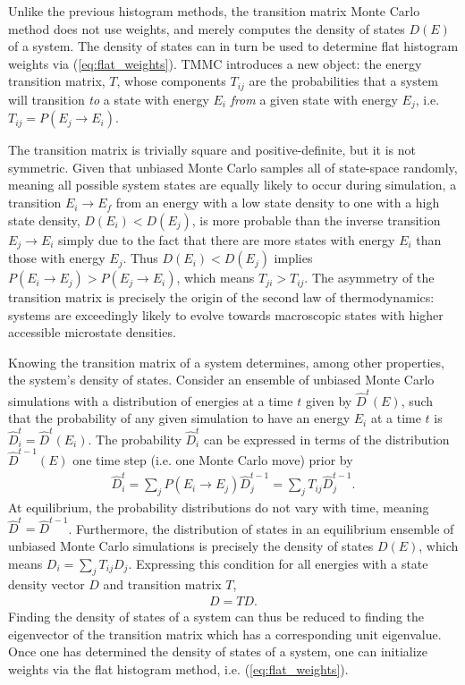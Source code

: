 \documentclass[11pt]{article}
\newcommand{\p}[1]{\left(#1\right)} %
\begin{document}
Unlike the previous histogram methods, the transition matrix Monte
Carlo method does not use weights, and merely computes the density of
states $D\p{E}$ of a system\cite{wang2002transition}. The density of
states can in turn be used to determine flat histogram weights via
(\ref{eq:flat_weights}). TMMC introduces a new object: the energy
transition matrix, $T$, whose components $T_{ij}$ are the
probabilities that a system will transition {\it to} a state with
energy $E_i$ {\it from} a given state with energy $E_j$,
i.e. $T_{ij}=P\p{E_j\to E_i}$.

The transition matrix is trivially square and positive-definite, but
it is not symmetric. Given that unbiased Monte Carlo samples all of
state-space randomly, meaning all possible system states are equally
likely to occur during simulation, a transition $E_i\to E_f$ from an
energy with a low state density to one with a high state density,
$D\p{E_i}<D\p{E_j}$, is more probable than the inverse transition
$E_j\to E_i$ simply due to the fact that there are more states with
energy $E_i$ than those with energy $E_j$. Thus $D\p{E_i}<D\p{E_j}$
implies $P\p{E_i\to E_j}>P\p{E_j\to E_i}$, which means
$T_{ji}>T_{ij}$. The asymmetry of the transition matrix is precisely
the origin of the second law of thermodynamics: systems are
exceedingly likely to evolve towards macroscopic states with higher
accessible microstate densities.

Knowing the transition matrix of a system determines, among other
properties, the system's density of states. Consider an ensemble of
unbiased Monte Carlo simulations with a distribution of energies at a
time $t$ given by $\hat D^{t}\p{E}$, such that the probability of any
given simulation to have an energy $E_i$ at a time $t$ is $\hat
D_i^{t}=\hat D^{t}\p{E_i}$. The probability $\hat D_i^{t}$ can be
expressed in terms of the distribution $\hat D^{t-1}\p{E}$ one time
step (i.e. one Monte Carlo move) prior by
\begin{align}
  \hat D_i^{t}=\sum_jP\p{E_i\to E_j}\hat D_j^{t-1} =\sum_j T_{ij}\hat
  D_j^{t-1}.
  \label{eq:transition_evolution}
\end{align}
At equilibrium, the probability distributions do not vary with time,
meaning $\hat D^{t}=\hat D^{t-1}$. Furthermore, the distribution of
states in an equilibrium ensemble of unbiased Monte Carlo simulations
is precisely the density of states $D\p{E}$, which means
$D_i=\sum_jT_{ij}D_j$.  Expressing this condition for all energies
with a state density vector $D$ and transition matrix $T$,
\begin{align}
  D=TD. \label{eq:dos_eigen}
\end{align}
Finding the density of states of a system can thus be reduced to
finding the eigenvector of the transition matrix which has a
corresponding unit eigenvalue. Once one has determined the density of
states of a system, one can initialize weights via the flat histogram
method, i.e. (\ref{eq:flat_weights}).
\end{document}
